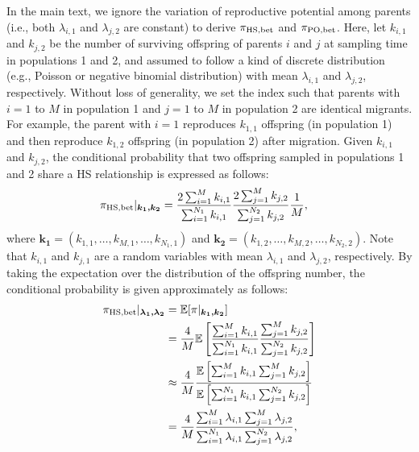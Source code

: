 \documentclass[12pt, English]{article}
\begin{document}
\begin{spacing}{1.9}
In the main text, we ignore the variation of reproductive potential among parents (i.e., both $\lambda_{i,1}$ and $\lambda_{j,2}$ are constant) to derive $\pi_{\rm HS,bet}$ and $\pi_{\rm PO,bet}$. Here, let $k_{i,1}$ and $k_{j,2}$ be the number of surviving offspring of parents $i$ and $j$ at sampling time in populations 1 and 2, and assumed to follow a kind of discrete distribution (e.g., Poisson or negative binomial distribution) with mean $\lambda_{i,1}$ and $\lambda_{j,2}$, respectively. Without loss of generality, we set the index such that parents with $i=1$ to $M$ in population 1 and $j=1$ to $M$ in population 2 are identical migrants. For example, the parent with $i=1$ reproduces $k_{1,1}$ offspring (in population 1) and then reproduce $k_{1,2}$ offspring (in population 2) after migration. Given $k_{i,1}$ and $k_{j,2}$, the conditional probability that two offspring sampled in populations 1 and 2 share a HS relationship is expressed as follows: 
\begin{align}
\pi_{\rm HS,bet} | _{\boldsymbol{k_1, k_2}} &= \frac{ 2\sum_{i=1}^M k_{i,1} } { \sum_{i=1}^{N_1} k_{i,1} } \frac{ 2\sum_{j=1}^M k_{j,2} } { \sum_{j=1}^{N_2} k_{j,2} } \frac{1}{M}, 
\end{align}
where $\boldsymbol{k_1}=(k_{1,1}, \ldots, k_{M,1}, \ldots, k_{N_1,1})$ and $\boldsymbol{k_2}=(k_{1,2}, \ldots, k_{M,2}, \ldots, k_{N_2,2})$. Note that $k_{i,1}$ and $k_{j,1}$ are a random variables with mean $\lambda_{i,1}$ and $\lambda_{j,2}$, respectively. By taking the expectation over the distribution of the offspring number, the conditional probability is given approximately as follows:
\begin{align}
\pi_{\rm HS,bet} | _{\boldsymbol{\lambda_1, \lambda_2}} &= \mathbb{E}[\pi | _{\boldsymbol{k_1, k_2}}] \nonumber\\
&= \frac{4}{M} \mathbb{E}\left[\frac{ \sum_{i=1}^M k_{i,1} } { \sum_{i=1}^{N_1} k_{i,1} } \frac{ \sum_{j=1}^M k_{j,2} } { \sum_{j=1}^{N_2} k_{j,2} } \right]   \nonumber\\
&\approx \frac{4}{M} \frac{ \mathbb{E}\left[ \sum_{i=1}^M k_{i,1} \sum_{j=1}^M k_{j,2} \right] } {\mathbb{E}\left[ \sum_{i=1}^{N_1} k_{i,1} \sum_{j=1}^{N_2} k_{j,2}\right]} \nonumber\\
&= \frac{4}{M} \frac{ \sum_{i=1}^M \lambda_{i,1} \sum_{j=1}^M \lambda_{j,2} } {\sum_{i=1}^{N_1} \lambda_{i,1} \sum_{j=1}^{N_2} \lambda_{j,2}},
\end{align}

\end{spacing}
\end{document}
